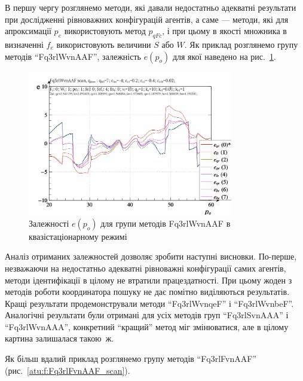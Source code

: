 В першу чергу розглянемо методи, які давали недостатньо
адекватні результати при дослідженні рівноважних конфігурацій
агентів, а саме --- методи, які для апроксимації
$p_e$ використовують метод
$p_{qFc}$, і при цьому в якості множника в визначенні
$f_e$ використовують величини
$S$ або
$W$. Як приклад розглянемо групу методів ``Fq3rlWvnAAF'', залежність
$e(p_o)$ для якої наведено на рис.~\ref{atu:f:Fq3rlWvnAAF_scan}.

\begin{figure}[htb!]
  \begin{center}
    \includegraphics[width=0.8\textwidth]{p/scan/qls-p_p_e_Fq3rlWvnAAF_scan.png}
  \end{center}
  \caption{Залежності $e(p_o)$ для групи методів Fq3rlWvnAAF в квазістаціонарному режимі}
  \label{atu:f:Fq3rlWvnAAF_scan}
\end{figure}


Аналіз отриманих залежностей дозволяє зробити наступні
висновки. По-перше, незважаючи на недостатньо адекватні
рівноважні конфігурації самих агентів, методи ідентифікації в
цілому не втратили працездатності. При цьому жоден з методів
роботи координатора пошуку не дає помітно виділяються
результатів. Кращі результати продемонстрували методи ``Fq3rlWvnqeF''
і ``Fq3rlWvnbeF''. Аналогічні результати були отримані для усіх
методів груп ``Fq3rlSvnAAA'' і ``Fq3rlWvnAAA'', конкретний ``кращий'' метод
міг змінюватися, але в цілому картина залишалася такою~ж.

Як більш вдалий приклад розглянемо групу методів ``Fq3rlFvnAAF''
(рис.~\ref{atu:f:Fq3rlFvnAAF_scan}).

